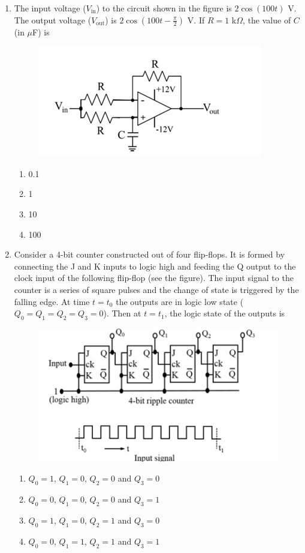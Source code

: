 \documentclass[journal,12pt,onecolumn]{IEEEtran}
\theoremstyle{remark}
\begin{document}
\begin{enumerate}
    
    \item The input voltage ($V_{\text{in}}$) to the circuit shown in the figure is $2\cos(100t)$ V. The output voltage ($V_{\text{out}}$) is $2\cos\left(100t - \frac{\pi}{2}\right)$ V. If $R = 1$ k$\Omega$, the value of $C$ (in $\mu$F) is
     \begin{figure}[H]
    \centering
    \includegraphics[width=0.5\columnwidth]{fig/Q29.png}
     \caption*{}
    \label{fig:Q19}
\end{figure}
   
    \begin{enumerate}
        \item 0.1
        \item 1
        \item 10
        \item 100
    \end{enumerate}
    
     \item Consider a 4-bit counter constructed out of four flip-flops. It is formed by connecting the J and K inputs to logic high and feeding the Q output to the clock input of the following flip-flop (see the figure). The input signal to the counter is a series of square pulses and the change of state is triggered by the falling edge. At time $t = t_0$ the outputs are in logic low state ($Q_0 = Q_1 = Q_2 = Q_3 = 0$). Then at $t = t_1$, the logic state of the outputs is
    \begin{figure}[H]
    \centering
    \includegraphics[width=0.5\columnwidth]{fig/Q30.png}
     \caption*{}
    \label{fig:Q30}
\end{figure}
   
    \begin{enumerate}
        \item $Q_0 = 1$, $Q_1 = 0$, $Q_2 = 0$ and $Q_3 = 0$
        \item $Q_0 = 0$, $Q_1 = 0$, $Q_2 = 0$ and $Q_3 = 1$
        \item $Q_0 = 1$, $Q_1 = 0$, $Q_2 = 1$ and $Q_3 = 0$
        \item $Q_0 = 0$, $Q_1 = 1$, $Q_2 = 1$ and $Q_3 = 1$
    \end{enumerate}
    


\end{enumerate}
\end{document}
